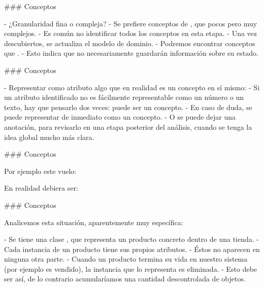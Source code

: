 ### Conceptos


- ¿Granularidad fina o compleja?
    - Se prefiere  conceptos de , que pocos pero muy complejos.
- Es común no identificar todos los conceptos en esta etapa.
    - Una vez descubiertos, se actualiza el modelo de dominio.
- Podremos encontrar conceptos que .
    - Esto indica que no necesariamente guardarán información sobre su estado.

### Conceptos


- Representar como atributo algo que en realidad es un concepto en sí mismo:
    - Si un atributo identificado no es fácilmente representable como un número o un texto,
    hay que pensarlo dos veces: puede ser un concepto.
    - En caso de duda, se puede representar de inmediato como un concepto.
    - O se puede dejar una anotación, para revisarlo en una etapa posterior del análisis,
    cuando se tenga la idea global mucho más clara.

### Conceptos


Por ejemplo este vuelo:


En realidad debiera ser:\newline


### Conceptos


Analicemos esta situación, aparentemente muy específica:

\columnsbegin


- Se tiene una clase , que representa un producto concreto dentro de una tienda.
- Cada instancia de un producto tiene sus propios atributos.
    - Éstos no aparecen en ninguna otra parte.
    - Cuando un producto termina su vida en nuestro sistema (por ejemplo es vendido), la
    instancia que lo representa es eliminada.
        - Esto debe ser así, de lo contrario acumularíamos una cantidad descontrolada de objetos.

